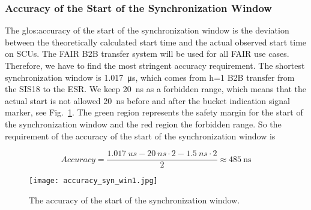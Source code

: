 \subsubsection{Accuracy of the Start of the Synchronization Window}
\label{cal_accuracy}
The \gls{glos:accuracy} of the start of the synchronization window is the deviation between the theoretically calculated start time and the actual observed start time on SCUs. The FAIR B2B transfer system will be used for all FAIR use cases. Therefore, we have to find the most stringent accuracy requirement. The shortest synchronization window is \SI{1.017}{\us}, which comes from h=1 B2B transfer from the SIS18 to the ESR. We keep \SI{20}{ns} as a forbidden range, which means that the actual start is not allowed \SI{20}{\ns} before and after the bucket indication signal marker, see Fig.~\ref{accuracy_syn_win1}. The green region represents the safety margin for the start of the synchronization window and the red region the forbidden range. So the requirement of the accuracy of the start of the synchronization window is 

\begin{equation}
Accuracy=\frac{\SI{1.017}{us}-\SI{20}{ns} \cdot 2-\SI{1.5}{ns} \cdot 2}{2}\approx  \SI{485}{\ns}\label{accu}
\end{equation}

\begin{figure}[!htb]
   \centering   
   \texttt{[image: accuracy\_syn\_win1.jpg]}
   \caption{The accuracy of the start of the synchronization window.}
   \label{accuracy_syn_win1}
\end{figure}




